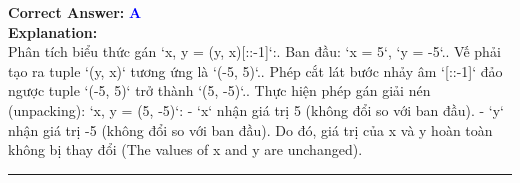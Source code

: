 \documentclass[11pt,a4paper]{article}
\begin{document}
\begin{minipage}{\textwidth}
\noindent \textbf{Correct Answer:} \textcolor{blue}{\textbf{A}} \\[4pt]
\noindent \textbf{Explanation:}\\
Phân tích biểu thức gán `x, y = (y, x)[::-1]`:. Ban đầu: `x = 5`, `y = -5`.. Vế phải tạo ra tuple `(y, x)` tương ứng là `(-5, 5)`.. Phép cắt lát bước nhảy âm `[::-1]` đảo ngược tuple `(-5, 5)` trở thành `(5, -5)`.. Thực hiện phép gán giải nén (unpacking): `x, y = (5, -5)`:\newline
   - `x` nhận giá trị 5 (không đổi so với ban đầu).\newline
   - `y` nhận giá trị -5 (không đổi so với ban đầu).\newline
Do đó, giá trị của x và y hoàn toàn không bị thay đổi (The values of x and y are unchanged).
\end{minipage}
\vspace{0.8cm}
\hrule
\vspace{0.5cm}
\end{document}
